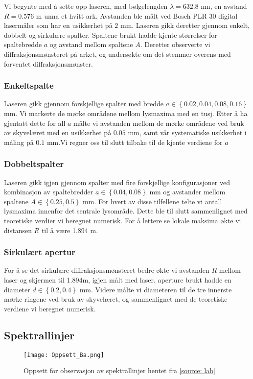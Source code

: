 \documentclass[reprint,norsk,notitlepage,floatfix]{revtex4-2}
\begin{document}
    Vi begynte med å sette opp laseren, med bølgelengden $λ = 632.8$ nm, en avstand $R = 0.576$ m unna et hvitt ark. Avstanden ble målt ved Bosch PLR 30 digital lasermåler som har en usikkerhet på $2$ mm.  
    Laseren gikk deretter gjennom enkelt, dobbelt og sirkulære spalter. Spaltene brukt hadde kjente størrelser for spaltebredde $a$ og avstand mellom spaltene $A$. Deretter observerte vi diffraksjonsmønsteret på arket, og undersøkte om det stemmer overens med forventet diffraksjonsmønster. 
    \subsubsection*{Enkeltspalte}
      Laseren gikk gjennom forskjellige spalter med bredde $a ∈ \left\{0.02, 0.04, 0.08, 0.16\right\}$ mm. Vi markerte de mørke områdene mellom lysmaxima med en tusj. Etter å ha gjentatt dette for all $a$ målte vi avstanden mellom de mørke områdene ved bruk av skyvelæret med en usikkerhet på $0.05$ mm, samt vår systematiske usikkerhet i måling på $0.1$ mm.Vi regner oss til slutt tilbake til de kjente verdiene for $a$

    \subsubsection*{Dobbeltspalter}
      Laseren gikk igjen gjennom spalter med fire forskjellige konfigurasjoner ved kombinasjon av spaltebredder $a ∈ \left\{0.04, 0.08\right\}$ mm og avstander mellom spaltene $A ∈ \left\{0.25, 0.5\right\}$ mm. For hvert av disse tilfellene telte vi antall lysmaxima innenfor det sentrale lysområde. Dette ble til slutt sammenlignet med teoretiske verdier vi beregnet numerisk. For å lettere se lokale maksima økte vi distansen $R$ til å være 1.894 m. 
    
    \subsubsection*{Sirkulært apertur}
      For å se det sirkulære diffraksjonsmønsteret bedre økte vi avstanden $R$ mellom laser og skjermen til 1.894m, igjen målt med laser. 
      aperture brukt hadde en diameter $d ∈ \left\{0.2, 0.4\right\}$ mm. Videre målte vi diameteren til de tre innerste mørke ringene ved bruk av skyvelæret, og sammenlignet med de teoretiske verdiene vi beregnet numerisk. 
      
      
  \subsection{Spektrallinjer}
    \begin{figure}[h!]
      \centering
      \texttt{[image: Oppsett\_Ba.png]}
      \caption{Oppsett for observasjon av spektrallinjer hentet fra \ref{source: lab}}
      \label{fig: Oppsett_Ba}
    \end{figure}
    
\end{document}
